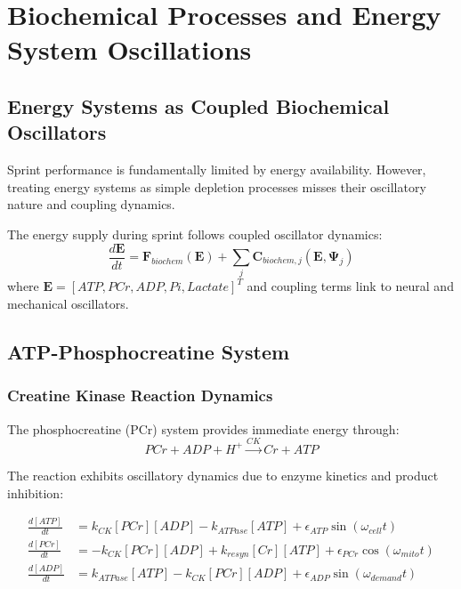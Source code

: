 \section{Biochemical Processes and Energy System Oscillations}

\subsection{Energy Systems as Coupled Biochemical Oscillators}

Sprint performance is fundamentally limited by energy availability. However, treating energy systems as simple depletion processes misses their oscillatory nature and coupling dynamics.

\begin{definition}
The energy supply during sprint follows coupled oscillator dynamics:
\begin{equation}
\frac{d\mathbf{E}}{dt} = \mathbf{F}_{biochem}(\mathbf{E}) + \sum_{j} \mathbf{C}_{biochem,j}(\mathbf{E}, \mathbf{\Psi}_j)
\label{eq:biochem_system}
\end{equation}
where $\mathbf{E} = [ATP, PCr, ADP, Pi, Lactate]^T$ and coupling terms link to neural and mechanical oscillators.
\end{definition}

\subsection{ATP-Phosphocreatine System}

\subsubsection{Creatine Kinase Reaction Dynamics}

The phosphocreatine (PCr) system provides immediate energy through:
\begin{equation}
PCr + ADP + H^+ \xrightarrow{CK} Cr + ATP
\label{eq:pcr_reaction}
\end{equation}

The reaction exhibits oscillatory dynamics due to enzyme kinetics and product inhibition:

\begin{align}
\frac{d[ATP]}{dt} &= k_{CK}[PCr][ADP] - k_{ATPase}[ATP] + \epsilon_{ATP} \sin(\omega_{cell} t) \label{eq:atp_dynamics}\\
\frac{d[PCr]}{dt} &= -k_{CK}[PCr][ADP] + k_{resyn}[Cr][ATP] + \epsilon_{PCr} \cos(\omega_{mito} t) \label{eq:pcr_dynamics}\\
\frac{d[ADP]}{dt} &= k_{ATPase}[ATP] - k_{CK}[PCr][ADP] + \epsilon_{ADP} \sin(\omega_{demand} t) \label{eq:adp_dynamics}
\end{align}

